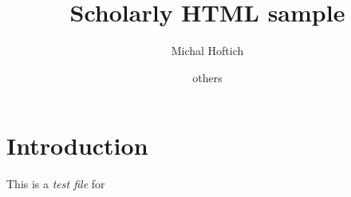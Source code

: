 \documentclass{article}
\title{Scholarly HTML sample}
\author{Michal Hoftich \and others}
\begin{document}
\maketitle
\tableofcontents

\section{Introduction}

This is a \textit{test file} for \cite{scholarly}

\printbibliography
\end{document}
